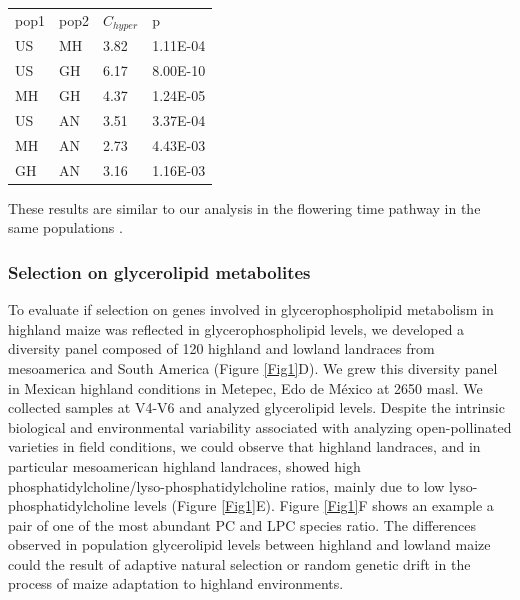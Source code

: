 \documentclass[9pt,twocolumn,twoside,lineno]{gsajnl}
\begin{document}
\begin{table}[]
\begin{tabular}{llll}
pop1 & pop2 & $C_{hyper}$    & p        \\
US   & MH   & 3.82 & 1.11E-04 \\
US   & GH   & 6.17 & 8.00E-10 \\
MH   & GH   & 4.37 & 1.24E-05 \\
US   & AN   & 3.51 & 3.37E-04 \\
MH   & AN   & 2.73 & 4.43E-03 \\
GH   & AN   & 3.16 & 1.16E-03 \\
\end{tabular}
\end{table}

These results are similar to our analysis in the flowering time pathway in the same populations \cite{Wang2020-mp}. 

\subsubsection{Selection on glycerolipid metabolites} 
To evaluate if selection on genes involved in glycerophospholipid metabolism in highland maize was reflected in glycerophospholipid levels, we developed a diversity panel composed of 120 highland and lowland landraces from mesoamerica and South America (Figure \ref{Fig1}D). 
We grew this diversity panel in Mexican highland conditions in Metepec, Edo de México at 2650 masl.
We collected samples at V4-V6 and analyzed glycerolipid levels. 
Despite the intrinsic biological and environmental variability associated with analyzing open-pollinated varieties in field conditions, we could observe that highland landraces, and in particular mesoamerican highland landraces, showed  high phosphatidylcholine/lyso-phosphatidylcholine ratios, mainly due to low lyso-phosphatidylcholine levels (Figure \ref{Fig1}E). 
Figure \ref{Fig1}F shows an example a pair of one of the most abundant PC and LPC species ratio. 
The differences observed in population glycerolipid levels between highland and lowland maize could the result of adaptive natural selection or random genetic drift in the process of maize adaptation to highland environments.
\end{document}
